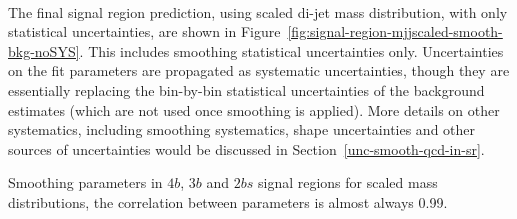 \paragraph{}
The final signal region prediction, using scaled di-jet mass distribution, with only statistical uncertainties, are shown in Figure~\ref{fig:signal-region-mjjscaled-smooth-bkg-noSYS}. 
This includes smoothing statistical uncertainties only. 
Uncertainties on the fit parameters are propagated as systematic uncertainties, though they are essentially replacing the bin-by-bin statistical uncertainties of the background estimates (which are not used once smoothing is applied).
More details on other systematics, including smoothing systematics, shape uncertainties and other sources of uncertainties would be discussed in Section~\ref{unc-smooth-qcd-in-sr}.

\begin{table}[htbp!]
\begin{center}
\caption{Smoothing parameters in $4b$, $3b$ and $2bs$ signal regions for scaled mass distributions, the correlation between parameters is almost always 0.99.}

\label{tab:smoothparams_pole}
\end{center}
\end{table}

